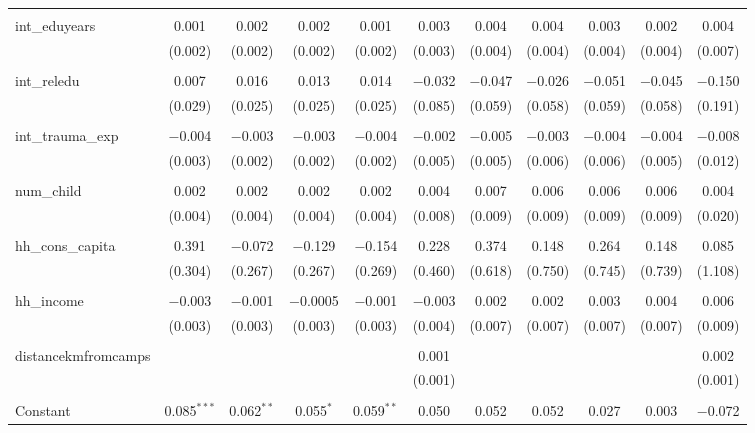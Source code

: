 \begin{table}[H]
\begin{tabular}{@{\extracolsep{4pt}}lcccccccccc}
  & & & & & & & & & & \\ 
 int\_eduyears & 0.001 & 0.002 & 0.002 & 0.001 & 0.003 & 0.004 & 0.004 & 0.003 & 0.002 & 0.004 \\ 
  & (0.002) & (0.002) & (0.002) & (0.002) & (0.003) & (0.004) & (0.004) & (0.004) & (0.004) & (0.007) \\ 
  & & & & & & & & & & \\ 
 int\_reledu & 0.007 & 0.016 & 0.013 & 0.014 & $-$0.032 & $-$0.047 & $-$0.026 & $-$0.051 & $-$0.045 & $-$0.150 \\ 
  & (0.029) & (0.025) & (0.025) & (0.025) & (0.085) & (0.059) & (0.058) & (0.059) & (0.058) & (0.191) \\ 
  & & & & & & & & & & \\ 
 int\_trauma\_exp & $-$0.004 & $-$0.003 & $-$0.003 & $-$0.004 & $-$0.002 & $-$0.005 & $-$0.003 & $-$0.004 & $-$0.004 & $-$0.008 \\ 
  & (0.003) & (0.002) & (0.002) & (0.002) & (0.005) & (0.005) & (0.006) & (0.006) & (0.005) & (0.012) \\ 
  & & & & & & & & & & \\ 
 num\_child & 0.002 & 0.002 & 0.002 & 0.002 & 0.004 & 0.007 & 0.006 & 0.006 & 0.006 & 0.004 \\ 
  & (0.004) & (0.004) & (0.004) & (0.004) & (0.008) & (0.009) & (0.009) & (0.009) & (0.009) & (0.020) \\ 
  & & & & & & & & & & \\ 
 hh\_cons\_capita & 0.391 & $-$0.072 & $-$0.129 & $-$0.154 & 0.228 & 0.374 & 0.148 & 0.264 & 0.148 & 0.085 \\ 
  & (0.304) & (0.267) & (0.267) & (0.269) & (0.460) & (0.618) & (0.750) & (0.745) & (0.739) & (1.108) \\ 
  & & & & & & & & & & \\ 
 hh\_income & $-$0.003 & $-$0.001 & $-$0.0005 & $-$0.001 & $-$0.003 & 0.002 & 0.002 & 0.003 & 0.004 & 0.006 \\ 
  & (0.003) & (0.003) & (0.003) & (0.003) & (0.004) & (0.007) & (0.007) & (0.007) & (0.007) & (0.009) \\ 
  & & & & & & & & & & \\ 
 distancekmfromcamps &  &  &  &  & 0.001 &  &  &  &  & 0.002 \\ 
  &  &  &  &  & (0.001) &  &  &  &  & (0.001) \\ 
  & & & & & & & & & & \\ 
 Constant & 0.085$^{***}$ & 0.062$^{**}$ & 0.055$^{*}$ & 0.059$^{**}$ & 0.050 & 0.052 & 0.052 & 0.027 & 0.003 & $-$0.072 \\ 

\end{tabular}
\end{table}
